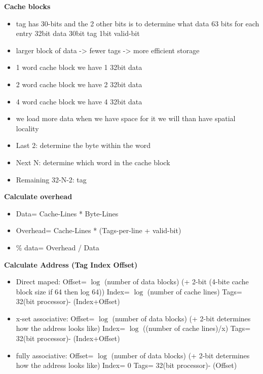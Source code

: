 \textbf{Cache blocks}
\begin{itemize}
\item tag has 30-bits and the 2 other bits is to determine what data
  63 bits for each entry 32bit data 30bit tag 1bit valid-bit 
\item larger block of data -> fewer tags -> more efficient storage
\item 1 word cache block we have 1 32bit data
\item 2 word cache block we have 2 32bit data 
\item 4 word cache block we have 4 32bit data
\item we load more data when we have space for it
  we will than have spatial locality
\item Last 2: determine the byte within the word   
\item Next N: determine which word in the cache block 
\item Remaining 32-N-2: tag
\end{itemize}

\textbf{Calculate overhead}
\begin{itemize}
\item  Data= Cache-Lines * Byte-Lines
\item  Overhead= Cache-Lines * (Tags-per-line + valid-bit)
\item  \% data=  Overhead / Data
\end{itemize}

\textbf{Calculate Address (Tag Index Offset)} %
\begin{itemize}
\item  Direct maped: \newline
  Offset= $\log$ (number of data blocks)  (+ 2-bit (4-bite cache block size if 64 then log 64)) \newline
  Index= $\log$ (number of cache lines) \newline
  Tags= 32(bit processor)- (Index+Offset) 
\item  x-set associative: \newline
  Offset= $\log$ (number of data blocks)  (+ 2-bit determines how the address looks like) \newline
  Index= $\log$ ((number of cache lines)/x) \newline
  Tags= 32(bit processor)- (Index+Offset)
\item  fully associative: \newline
  Offset= $\log$ (number of data blocks)  (+ 2-bit determines how the address looks like) \newline
  Index= 0 \newline
  Tags= 32(bit processor)- (Offset)
\end{itemize}

